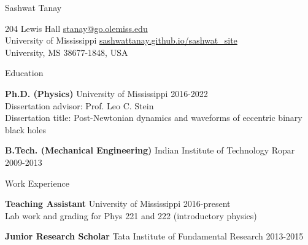 \documentclass{resume} %
\begin{document}
  


  
  
\begin{center}
    {\huge Sashwat Tanay} \\ 
\end{center}



204 Lewis Hall   \hfill  \href{stanay@go.olemiss.edu}{stanay@go.olemiss.edu} \\
University of Mississippi   \hfill  \href{https://sashwattanay.github.io/sashwat_site}{sashwattanay.github.io/sashwat\_site}\\
University, MS 38677-1848, USA



\begin{rSection}{Education}


{\bf Ph.D. (Physics) } University of Mississippi \hfill {2016-2022}  \\
Dissertation advisor: Prof. Leo C. Stein  \\
Dissertation title: Post-Newtonian dynamics and waveforms of eccentric binary black holes 

{\bf B.Tech. (Mechanical Engineering) } Indian Institute of Technology Ropar \hfill {2009-2013}  \\

\end{rSection}



  

\begin{rSection}{Work Experience}

{\bf Teaching Assistant } University of Mississippi \hfill 2016-present  \\
\hspace*{1cm} Lab work and grading for Phys 221 and 222 (introductory physics) 


{\bf Junior Research Scholar} Tata Institute of Fundamental Research \hfill 2013-2015 


\end{rSection}
  
\end{document}
